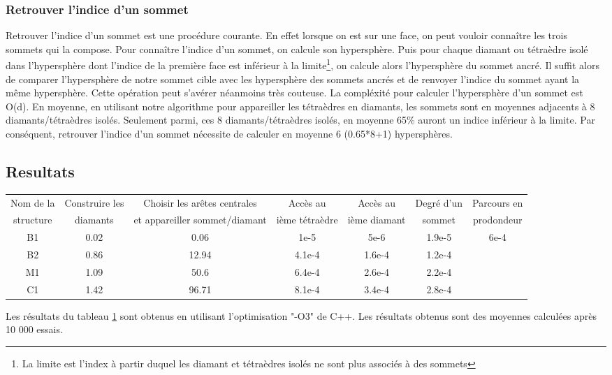 \documentclass[a4paper,11pt,openany]{article}
\begin{document}
\subsubsection{Retrouver l'indice d'un sommet}
\label{Retrouver l'indice d'un sommet}
\noindent
Retrouver l'indice d'un sommet est une procédure courante. En effet lorsque on est sur une face, on peut vouloir connaître les trois sommets qui la compose. Pour connaître l'indice d'un sommet, on calcule son hypersphère. Puis pour chaque diamant ou tétraèdre isolé dans l'hypersphère dont l'indice de la première face est inférieur à la limite\footnote{La limite est l'index à partir duquel les diamant et tétraèdres isolés ne sont plus associés à des sommets}, on calcule alors l'hypersphère du sommet ancré. Il suffit alors de comparer l'hypersphère de notre sommet cible avec les hypersphère des sommets ancrés et de renvoyer l'indice du sommet ayant la même hypersphère. Cette opération peut s'avérer néanmoins très couteuse. La compléxité pour calculer l'hypersphère d'un sommet est O(d). En moyenne, en utilisant notre algorithme pour appareiller les tétraèdres en diamants, les sommets sont en moyennes adjacents à 8 diamants/tétraèdres isolés. Seulement parmi, ces 8 diamants/tétraèdres isolés, en moyenne 65\% auront un indice inférieur à la limite. Par conséquent, retrouver l'indice d'un sommet nécessite de calculer en moyenne 6 (0.65*8+1) hypersphères.
\subsection{Resultats}
\noindent
\begin{table}[H]
\footnotesize
\begin{tabular}{|c | c | c | c | c| c |c |}
\hline
Nom de la & Construire les & Choisir les arêtes centrales & Accès au& Accès au & Degré d'un & Parcours en\\
structure & diamants & et appareiller sommet/diamant &ième tétraèdre& ième diamant &sommet&prodondeur\\
\hline
B1 & 0.02 & 0.06 & 1e-5 & 5e-6 & 1.9e-5 & 6e-4\\
B2 & 0.86 & 12.94 &  4.1e-4 & 1.6e-4 & 1.2e-4 & \\
M1 & 1.09 & 50.6 & 6.4e-4 & 2.6e-4 & 2.2e-4 & \\
C1 & 1.42 & 96.71 & 8.1e-4 & 3.4e-4 & 2.8e-4 & \\
\hline  
\end{tabular}
\label{Tab:results_time}
\end{table}
\noindent
Les résultats du tableau \ref{Tab:results_time} sont obtenus en utilisant l'optimisation "-O3" de C++. Les résultats obtenus sont des moyennes calculées après 10 000 essais.
\end{document}
